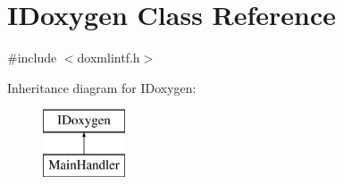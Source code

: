 \hypertarget{class_i_doxygen}{}\section{I\+Doxygen Class Reference}
\label{class_i_doxygen}


{\ttfamily \#include $<$doxmlintf.\+h$>$}

Inheritance diagram for I\+Doxygen\+:\begin{figure}[H]
\begin{center}
\leavevmode
\includegraphics[height=2.000000cm]{class_i_doxygen}
\end{center}
\end{figure}
